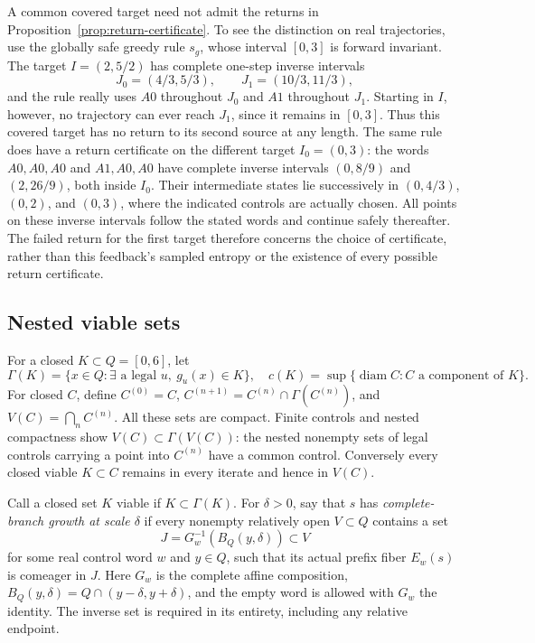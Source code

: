 \documentclass[11pt,reqno]{amsart}
\numberwithin{equation}{section}
\theoremstyle{definition}
\begin{document}
A common covered target need not admit the returns in
Proposition~\ref{prop:return-certificate}. To see the distinction
on real trajectories, use the globally safe greedy rule $s_g$,
whose interval $[0,3]$ is forward invariant. The target
$I=(2,5/2)$ has complete one-step inverse intervals
\[
 J_0=(4/3,5/3),\qquad J_1=(10/3,11/3),
\]
and the rule really uses $A0$ throughout $J_0$ and $A1$
throughout $J_1$. Starting in $I$, however, no trajectory can
ever reach $J_1$, since it remains in $[0,3]$. Thus this
covered target has no return to its second source at any length.
The same rule does have a return certificate on the different
target $I_0=(0,3)$: the words $A0,A0,A0$ and $A1,A0,A0$
have complete inverse intervals $(0,8/9)$ and $(2,26/9)$,
both inside $I_0$. Their intermediate states lie successively
in $(0,4/3)$, $(0,2)$, and $(0,3)$, where the indicated
controls are actually chosen. All points on these inverse
intervals follow the stated words and continue safely thereafter.
The failed return for the first target therefore concerns the
choice of certificate, rather than this feedback's sampled entropy
or the existence of every possible return certificate.


\subsection{Nested viable sets}
For a closed $K\subset Q=[0,6]$, let
\[
 \Gamma(K)=\{x\in Q:\exists\text{ a legal }u,\ g_u(x)\in K\},
 \quad c(K)=\sup\{\operatorname{diam}C:C\text{ a component of }K\}.
\]
For closed $C$, define $C^{(0)}=C$,
$C^{(n+1)}=C^{(n)}\cap\Gamma(C^{(n)})$, and
$V(C)=\bigcap_n C^{(n)}$. All these sets are compact.
Finite controls and nested compactness show $V(C)\subset\Gamma(V(C))$:
the nested nonempty sets of legal controls carrying a point into
$C^{(n)}$ have a common control. Conversely every closed viable
$K\subset C$ remains in every iterate and hence in $V(C)$.

Call a closed set $K$ viable if $K\subset\Gamma(K)$.
For $\delta>0$, say that $s$ has \emph{complete-branch growth at scale
$\delta$} if every nonempty relatively open $V\subset Q$ contains a
set
\[
 J=G_w^{-1}(B_Q(y,\delta))\subset V
\]
for some real control word $w$ and $y\in Q$, such that its actual
prefix fiber $E_w(s)$ is comeager in $J$. Here $G_w$ is the complete
affine composition, $B_Q(y,\delta)=Q\cap(y-\delta,y+\delta)$,
and the empty word is allowed with $G_w$ the identity. The inverse
set is required in its entirety, including any relative endpoint.
\end{document}
